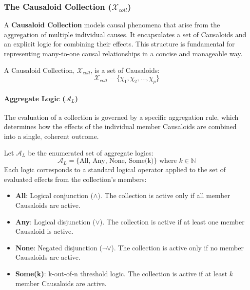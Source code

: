 \subsubsection{The Causaloid Collection (\(\mathcal{X}_{coll}\))}
\label{ssec:causaloid_collection_formal}

A \textbf{Causaloid Collection} models causal phenomena that arise from the aggregation of multiple individual causes. It encapsulates a set of Causaloids and an explicit logic for combining their effects. This structure is fundamental for representing many-to-one causal relationships in a concise and manageable way.


\begin{definition}
\label{def:causaloid_collection}
A Causaloid Collection, \(\mathcal{X}_{coll}\), is a set of Causaloids:
\[ \mathcal{X}_{coll} = \{\chi_1, \chi_2, \dots, \chi_p\} \]
\end{definition}

\paragraph{Aggregate Logic (\(\mathcal{A}_L\))} The evaluation of a collection is governed by a specific aggregation rule, which determines how the effects of the individual member Causaloids are combined into a single, coherent outcome.

\begin{definition}
\label{def:aggregate_logic}
Let \(\mathcal{A}_L\) be the enumerated set of aggregate logics:
\[ \mathcal{A}_L = \{\text{All, Any, None, Some(k)}\} \text{ where } k \in \mathbb{N} \]
Each logic corresponds to a standard logical operator applied to the set of evaluated effects from the collection's members:
\begin{itemize}
    \item \textbf{All}: Logical conjunction (\(\land\)). The collection is active only if all member Causaloids are active.
    \item \textbf{Any}: Logical disjunction (\(\lor\)). The collection is active if at least one member Causaloid is active.
    \item \textbf{None}: Negated disjunction (\(\neg \lor\)). The collection is active only if no member Causaloids are active.
    \item \textbf{Some(k)}: k-out-of-n threshold logic. The collection is active if at least \(k\) member Causaloids are active.
\end{itemize}
\end{definition}

